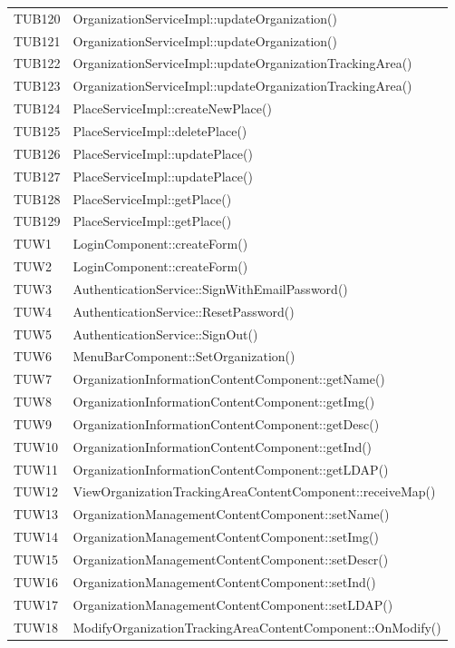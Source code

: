 {\begin{longtable}{C{2cm} C{12cm}}
		TUB120 & OrganizationServiceImpl::updateOrganization()\\
		TUB121 & OrganizationServiceImpl::updateOrganization()\\
		TUB122 & OrganizationServiceImpl::updateOrganizationTrackingArea()\\
		TUB123 & OrganizationServiceImpl::updateOrganizationTrackingArea()\\
		TUB124 & PlaceServiceImpl::createNewPlace()\\
		TUB125 & PlaceServiceImpl::deletePlace()\\
		TUB126 & PlaceServiceImpl::updatePlace()\\
		TUB127 & PlaceServiceImpl::updatePlace()\\
		TUB128 & PlaceServiceImpl::getPlace()\\
		TUB129 & PlaceServiceImpl::getPlace()\\
		TUW1 & LoginComponent::createForm() \\
		TUW2 & LoginComponent::createForm() \\
		TUW3 & AuthenticationService::SignWithEmailPassword() \\
		TUW4 & AuthenticationService::ResetPassword() \\
		TUW5 & AuthenticationService::SignOut() \\
		TUW6 & MenuBarComponent::SetOrganization() \\
		TUW7 & OrganizationInformationContentComponent::getName() \\
		TUW8 & OrganizationInformationContentComponent::getImg() \\
		TUW9 & OrganizationInformationContentComponent::getDesc() \\
		TUW10 & OrganizationInformationContentComponent::getInd() \\
		TUW11 & OrganizationInformationContentComponent::getLDAP() \\
		TUW12 & ViewOrganizationTrackingAreaContentComponent::receiveMap() \\
		TUW13 & OrganizationManagementContentComponent::setName() \\
		TUW14 & OrganizationManagementContentComponent::setImg() \\
		TUW15 & OrganizationManagementContentComponent::setDescr() \\
		TUW16 & OrganizationManagementContentComponent::setInd() \\
		TUW17 & OrganizationManagementContentComponent::setLDAP() \\
		TUW18 & ModifyOrganizationTrackingAreaContentComponent::OnModify() \\

\end{longtable}}
